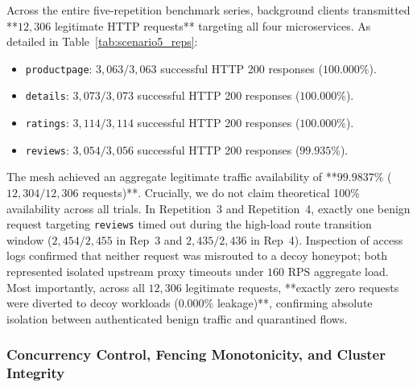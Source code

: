 Across the entire five-repetition benchmark series, background clients transmitted **$12{,}306$ legitimate HTTP requests** targeting all four microservices. As detailed in Table~\ref{tab:scenario5_reps}:
\begin{itemize}
    \item \texttt{productpage}: $3{,}063 / 3{,}063$ successful HTTP 200 responses ($100.000\%$).
    \item \texttt{details}: $3{,}073 / 3{,}073$ successful HTTP 200 responses ($100.000\%$).
    \item \texttt{ratings}: $3{,}114 / 3{,}114$ successful HTTP 200 responses ($100.000\%$).
    \item \texttt{reviews}: $3{,}054 / 3{,}056$ successful HTTP 200 responses ($99.935\%$).
\end{itemize}
The mesh achieved an aggregate legitimate traffic availability of **$99.9837\%$ ($12{,}304 / 12{,}306$ requests)**. Crucially, we do not claim theoretical 100\% availability across all trials. In Repetition~3 and Repetition~4, exactly one benign request targeting \texttt{reviews} timed out during the high-load route transition window ($2{,}454/2{,}455$ in Rep~3 and $2{,}435/2{,}436$ in Rep~4). Inspection of access logs confirmed that neither request was misrouted to a decoy honeypot; both represented isolated upstream proxy timeouts under $160\text{ RPS}$ aggregate load. Most importantly, across all $12{,}306$ legitimate requests, **exactly zero requests were diverted to decoy workloads ($0.000\%$ leakage)**, confirming absolute isolation between authenticated benign traffic and quarantined flows.

\subsubsection{Concurrency Control, Fencing Monotonicity, and Cluster Integrity}
\label{sec:scenario5_concurrency}

